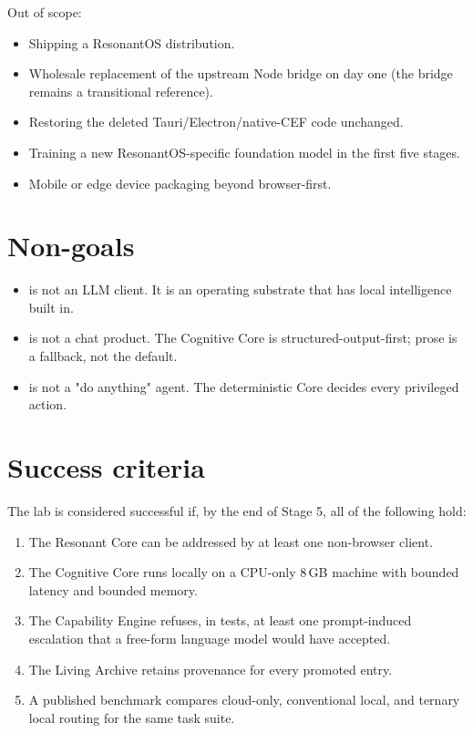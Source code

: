 Out of scope:
\begin{itemize}
  \item Shipping a ResonantOS distribution.
  \item Wholesale replacement of the upstream Node bridge on day one
        (the bridge remains a transitional reference).
  \item Restoring the deleted Tauri/Electron/native-CEF code unchanged.
  \item Training a new ResonantOS-specific foundation model in the
        first five stages.
  \item Mobile or edge device packaging beyond browser-first.
\end{itemize}

\section{Non-goals}

\begin{itemize}
  \item \RCCOS{} is not an LLM client. It is an operating substrate
        that has local intelligence built in.
  \item \RCCOS{} is not a chat product. The Cognitive Core is
        structured-output-first; prose is a fallback, not the
        default.
  \item \RCCOS{} is not a "do anything" agent. The deterministic Core
        decides every privileged action.
\end{itemize}

\section{Success criteria}

The lab is considered successful if, by the end of Stage 5, all of
the following hold:
\begin{enumerate}
  \item The Resonant Core can be addressed by at least one
        non-browser client.
  \item The Cognitive Core runs locally on a CPU-only 8\,GB machine
        with bounded latency and bounded memory.
  \item The Capability Engine refuses, in tests, at least one
        prompt-induced escalation that a free-form language model
        would have accepted.
  \item The Living Archive retains provenance for every promoted
        entry.
  \item A published benchmark compares cloud-only, conventional
        local, and ternary local routing for the same task suite.
\end{enumerate}
